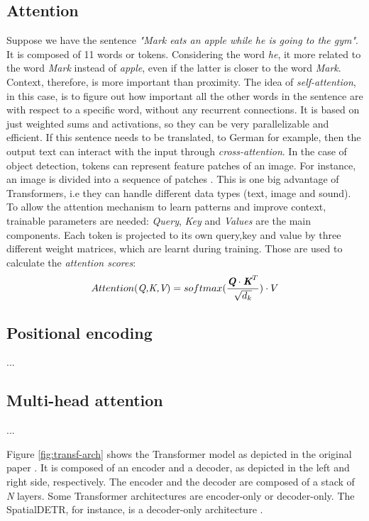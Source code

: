\subsection{Attention}
Suppose we have the sentence \emph{"Mark eats an apple while he is going to the gym"}. It is composed of 11 words or tokens. Considering the word \emph{he}, it more related to the word \emph{Mark} instead of \emph{apple}, even if the latter is closer to the word \emph{Mark}. Context, therefore, is more important than proximity. The idea of \emph{self-attention}, in this case, is to figure out how important all the other words in the sentence are with respect to a specific word, without any recurrent connections. It is based on just weighted sums and activations, so they can be very parallelizable and efficient. If this sentence needs to be translated, to German for example, then the output text can interact with the input through \emph{cross-attention}.
In the case of object detection, tokens can represent feature patches of an image. For instance, an image is divided into a sequence of patches \cite{dosovitskiy2020image}\cite{carion2020end}. This is one big advantage of Transformers, i.e they can handle different data types (text, image and sound).
To allow the attention mechanism to learn patterns and improve context, trainable parameters are needed: \emph{Query}, \emph{Key} and \emph{Values} are the main components. Each token is projected to its own query,key and value by three different weight matrices, which are learnt during training. Those are used to calculate the \emph{attention scores}:
\begin{equation}
    Attention(\emph{Q,K,V}) = softmax(\frac{\emph{\textbf{Q}} \cdot \emph{\textbf{K}}^T}{\sqrt{d_{k}}}) \cdot V
\end{equation}


\subsection{Positional encoding}
...
\subsection{Multi-head attention}
...


Figure \ref{fig:transf-arch} shows the Transformer model as depicted in the original paper \cite{Att.2017}. It is composed of an encoder and a decoder, as depicted in the left and right side, respectively. The encoder and the decoder are composed of a stack of \emph{N} layers. Some Transformer architectures are encoder-only or decoder-only. The SpatialDETR, for instance, is a decoder-only architecture \cite{doll2022spatialdetr}.

